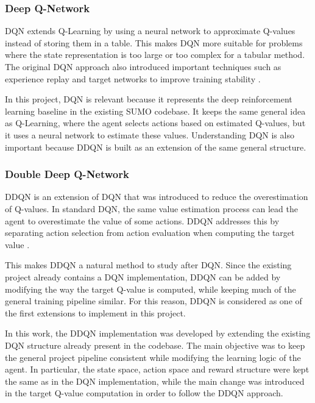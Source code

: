 \documentclass{article}
\begin{document}
\subsubsection{Deep Q-Network}

DQN extends Q-Learning by using a neural network to approximate Q-values instead of storing them in a table. This makes DQN more suitable for problems where the state representation is too large or too complex for a tabular method. The original DQN approach also introduced important techniques such as experience replay and target networks to improve training stability \cite{mnih2015human}.

In this project, DQN is relevant because it represents the deep reinforcement learning baseline in the existing SUMO codebase. It keeps the same general idea as Q-Learning, where the agent selects actions based on estimated Q-values, but it uses a neural network to estimate these values. Understanding DQN is also important because DDQN is built as an extension of the same general structure.


\subsubsection{Double Deep Q-Network}

DDQN is an extension of DQN that was introduced to reduce the overestimation of Q-values. In standard DQN, the same value estimation process can lead the agent to overestimate the value of some actions. DDQN addresses this by separating action selection from action evaluation when computing the target value \cite{vanhasselt2016deep}.

This makes DDQN a natural method to study after DQN. Since the existing project already contains a DQN implementation, DDQN can be added by modifying the way the target Q-value is computed, while keeping much of the general training pipeline similar. For this reason, DDQN is considered as one of the first extensions to implement in this project.

In this work, the DDQN implementation was developed by extending the existing DQN structure already present in the codebase. The main objective was to keep the general project pipeline consistent while modifying the learning logic of the agent. In particular, the state space, action space and reward structure were kept the same as in the DQN implementation, while the main change was introduced in the target Q-value computation in order to follow the DDQN approach.
\end{document}
